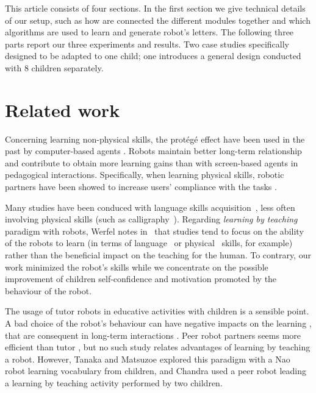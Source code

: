 \documentclass{sig-alternate}
\begin{document}
This article consists of four sections. In the first section we give technical details of our setup, such as how are connected the different modules
together and which algorithms are used to learn and generate robot's letters.
The following three parts report our three experiments and results. Two case studies specifically designed to be adapted to one child; one introduces a general design conducted with 8 children separately. 

\section{Related work}

Concerning learning non-physical skills, the prot\'eg\'e effect have been used in the past by computer-based agents \cite{Chase2009}.
Robots maintain better long-term relationship \cite{Kidd2008} and contribute to obtain more learning gains \cite{Leyzberg2014} than with screen-based agents in pedagogical interactions. Specifically, when learning physical skills, robotic partners have been showed to increase users' compliance with the tasks \cite{Bainbridge2011}.

Many studies have been conduced with language skills
acquisition~\cite{han2010robot}, less often involving physical skills (such as
calligraphy~\cite{Matsui2013}). Regarding \textit{learning by teaching} paradigm with
robots, Werfel notes in~\cite{Werfel2014} that studies tend to focus on the
ability of the robots to learn (in terms of language~\cite{Saunders2010} or
physical~\cite{Mulling2013} skills, for example) rather than the beneficial impact
on the teaching for the human. To contrary, our work minimized the robot's skills while we
concentrate on the possible improvement of children self-confidence and
motivation promoted by the behaviour of the robot.

The usage of tutor robots in educative activities with children is a sensible point. A bad choice of the robot's behaviour can have negative impacts on the learning \cite{kennedy2015robot}, that are consequent in long-term interactions \cite{leite2014empathic}. Peer robot partners seems more efficient than tutor \cite{zaga2015effect}, but no such study relates advantages of learning by teaching a robot. However, Tanaka and Matsuzoe \cite{Tanaka2012} explored this paradigm with a Nao robot learning vocabulary from children, and Chandra \cite{chandra2015can} used a peer robot leading a learning by teaching activity performed by two children.
\end{document}
